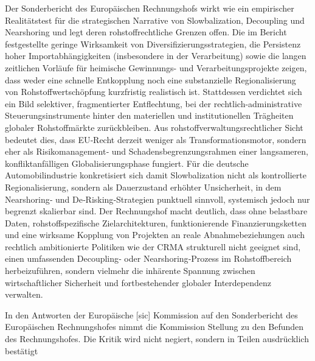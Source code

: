 \documentclass[12pt,a4paper,oneside]{book} %
\begin{document}
Der Sonderbericht des Europäischen Rechnungshofs wirkt wie ein empirischer Realitätstest für die strategischen Narrative von Slowbalization, Decoupling und Nearshoring und legt deren rohstoffrechtliche Grenzen offen. Die im Bericht festgestellte geringe Wirksamkeit von Diversifizierungsstrategien, die Persistenz hoher Importabhängigkeiten (insbesondere in der Verarbeitung) sowie die langen zeitlichen Vorläufe für heimische Gewinnungs- und Verarbeitungsprojekte zeigen, dass weder eine schnelle Entkopplung noch eine substanzielle Regionalisierung von Rohstoffwertschöpfung kurzfristig realistisch ist. Stattdessen verdichtet sich ein Bild selektiver, fragmentierter Entflechtung, bei der rechtlich-administrative Steuerungsinstrumente hinter den materiellen und institutionellen Trägheiten globaler Rohstoffmärkte zurückbleiben. Aus rohstoffverwaltungsrechtlicher Sicht bedeutet dies, dass EU‑Recht derzeit weniger als Transformationsmotor, sondern eher als Risikomanagement‑ und Schadensbegrenzungsrahmen einer langsameren, konfliktanfälligen Globalisierungsphase fungiert. Für die deutsche Automobilindustrie konkretisiert sich damit Slowbalization nicht als kontrollierte Regionalisierung, sondern als Dauerzustand erhöhter Unsicherheit, in dem Nearshoring‑ und De‑Risking‑Strategien punktuell sinnvoll, systemisch jedoch nur begrenzt skalierbar sind. Der Rechnungshof macht deutlich, dass ohne belastbare Daten, rohstoffspezifische Zielarchitekturen, funktionierende Finanzierungsketten und eine wirksame Kopplung von Projekten an reale Abnahmebeziehungen auch rechtlich ambitionierte Politiken wie der CRMA strukturell nicht geeignet sind, einen umfassenden Decoupling‑ oder Nearshoring‑Prozess im Rohstoffbereich herbeizuführen, sondern vielmehr die inhärente Spannung zwischen wirtschaftlicher Sicherheit und fortbestehender globaler Interdependenz verwalten.

In den \glqq Antworten der Europäische [sic] Kommission auf den Sonderbericht des Europäischen Rechnungshofes\grqq \autocite{https://www.eca.europa.eu/Lists/ECAReplies/COM-Replies-SR-2026-04/COM-Replies-SR-2026-04_DE.pdf} nimmt die Kommission Stellung zu den Befunden des Rechnungshofes. Die Kritik wird nicht negiert, sondern in Teilen ausdrücklich bestätigt
\end{document}
